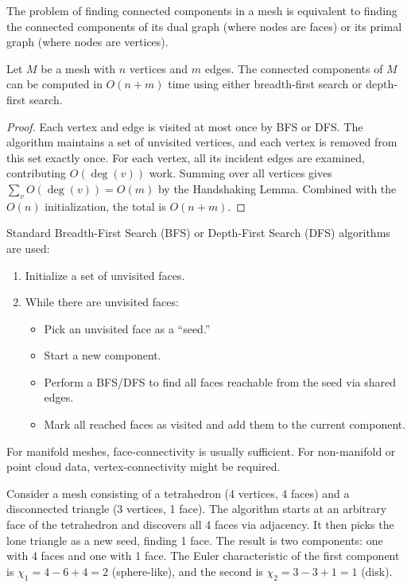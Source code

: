 The problem of finding connected components in a mesh is equivalent to finding the connected components of its dual graph (where nodes are faces) or its primal graph (where nodes are vertices).

\begin{theorem}\label{thm:component_count}
Let $M$ be a mesh with $n$ vertices and $m$ edges. The connected components of $M$ can be computed in $O(n + m)$ time using either breadth-first search or depth-first search.
\end{theorem}

\begin{proof}
Each vertex and edge is visited at most once by BFS or DFS. The algorithm maintains a set of unvisited vertices, and each vertex is removed from this set exactly once. For each vertex, all its incident edges are examined, contributing $O(\deg(v))$ work. Summing over all vertices gives $\sum_{v} O(\deg(v)) = O(m)$ by the Handshaking Lemma\cite{diestel2017}. Combined with the $O(n)$ initialization, the total is $O(n + m)$.
\end{proof}

Standard Breadth-First Search (BFS) or Depth-First Search (DFS) algorithms are used:
\begin{enumerate}
    \item Initialize a set of unvisited faces.
    \item While there are unvisited faces:
    \begin{itemize}
        \item Pick an unvisited face as a ``seed.''
        \item Start a new component.
        \item Perform a BFS/DFS to find all faces reachable from the seed via shared edges.
        \item Mark all reached faces as visited and add them to the current component.
    \end{itemize}
\end{enumerate}

For manifold meshes, face-connectivity is usually sufficient. For non-manifold or point cloud data, vertex-connectivity might be required.

\begin{example}\label{ex:connected_components}
Consider a mesh consisting of a tetrahedron (4 vertices, 4 faces) and a disconnected triangle (3 vertices, 1 face). The algorithm starts at an arbitrary face of the tetrahedron and discovers all 4 faces via adjacency. It then picks the lone triangle as a new seed, finding 1 face. The result is two components: one with 4 faces and one with 1 face. The Euler characteristic of the first component is $\chi_1 = 4 - 6 + 4 = 2$ (sphere-like), and the second is $\chi_2 = 3 - 3 + 1 = 1$ (disk).
\end{example}

